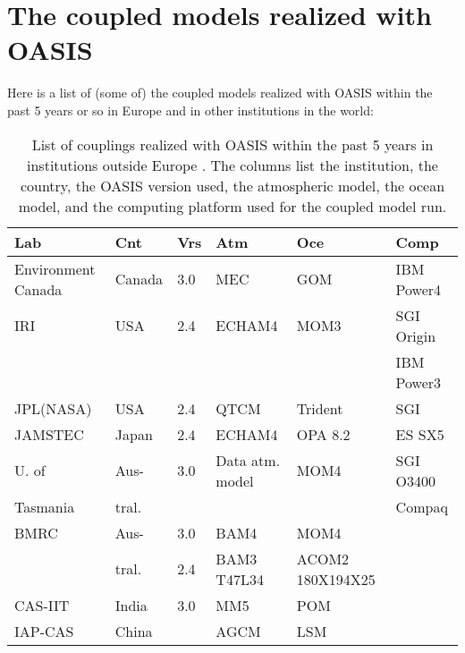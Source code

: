\newpage

\chapter{The coupled models realized with OASIS}
\label{sec_couplings}

Here is a list of (some of) the coupled models realized with OASIS
within the past 5 years or so in Europe and in other institutions
in the world:

\vspace*{3cm}

\begin{table}[hbtp]
\begin{center}
\begin{tabular}{|l|l|l|l|l|l|}
\hline
Lab & Cnt & Vrs & Atm & Oce & Comp \\
\hline
\hline
Environment Canada & Canada & 3.0  & MEC & GOM  & IBM Power4 \\ 
\hline     
IRI     & USA & 2.4 & ECHAM4             & MOM3            & SGI Origin \\
        &     &     &                    &                 & IBM Power3\\
\hline
JPL(NASA) & USA & 2.4 & QTCM             & Trident            & SGI \\
\hline
JAMSTEC	& Japan  & 2.4 & ECHAM4	         & OPA 8.2	   & ES SX5 \\
\hline
U. of & Aus- & 3.0 & Data atm. model & MOM4         & SGI O3400\\
Tasmania & tral.     &     &                    &                 & Compaq \\
\hline
BMRC	& Aus-    & 3.0 & BAM4         & MOM4            &        \\	
        & tral.          & 2.4 & BAM3 T47L34	 & ACOM2 180X194X25&        \\	
\hline
CAS-IIT & India	    & 3.0 & MM5          & POM             &        \\
\hline
IAP-CAS & China &   & AGCM               & LSM             &  \\
\hline	
\end{tabular}
\end{center}
\caption{List of couplings realized with OASIS within the past 5 years
in institutions outside Europe . The columns list the institution, the
country, the OASIS version used, the atmospheric model, the ocean
model, and the computing platform used for the coupled model run.}
\label{tab.couplingsworld}
\end{table}


